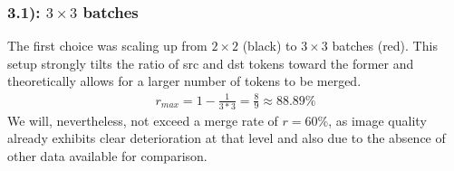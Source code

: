 \subsubsection*{3.1): $3 \times 3$ batches}
The first choice was scaling up from $2 \times 2$ (black) to $3 \times 3$ batches (red). This setup strongly tilts the ratio of src and dst tokens toward the former and theoretically allows for a larger number of tokens to be merged. 
\begin{align*}
    r_{max} = 1-\frac{1}{3*3} = \frac{8}{9} \approx 88.89\%
\end{align*}
We will, nevertheless, not exceed a merge rate of \(r=60\%\), as image quality already exhibits clear deterioration at that level and also due to the absence of other data available for comparison.



